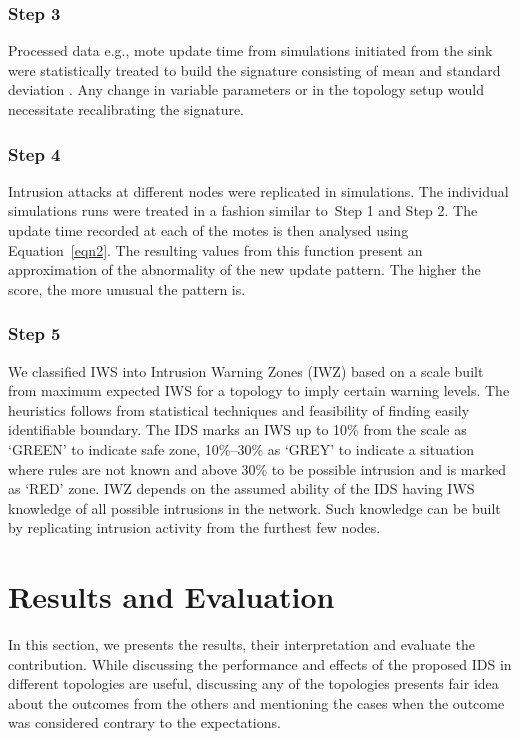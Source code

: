 \documentclass[conference]{IEEEtran}
\begin{document}
\subsubsection*{Step 3} 
Processed data e.g., mote update time from simulations initiated from the sink were statistically treated to build the signature consisting of mean and standard deviation .
Any change in variable parameters or in the topology setup would necessitate recalibrating the signature.

\subsubsection*{Step 4} 
Intrusion attacks at different nodes were replicated in simulations.
The individual simulations runs were treated in a fashion  similar to~Step 1 and Step 2.
The update time recorded at each of the motes is then analysed using Equation~\ref{eqn2}.
The resulting values from this function present an approximation of the abnormality of the new update pattern. The higher the score, the more unusual the pattern is. 

\subsubsection*{Step 5} 
We classified IWS into Intrusion Warning Zones (IWZ) based on a scale built from maximum expected IWS for a topology to imply certain warning levels.
The heuristics follows from statistical techniques and feasibility of finding easily identifiable boundary.
The IDS marks an IWS up to 10\% from the scale as `GREEN' to indicate safe zone,
10\%--30\% as `GREY' to indicate a situation where rules are not known and 
above 30\% to be possible intrusion and is marked as `RED' zone.
IWZ depends on the assumed ability of the IDS having IWS knowledge of all possible intrusions in the network.
Such knowledge can be built by replicating intrusion activity from the furthest few nodes.

\section{Results and Evaluation}
\label{sec:eval}


In this section, we presents the results, their interpretation and evaluate the contribution.
While discussing the performance and effects of the proposed IDS in different topologies are useful, discussing any of the topologies presents fair idea about the outcomes from the others and mentioning the cases when the outcome was considered  contrary to the expectations.
\end{document}
